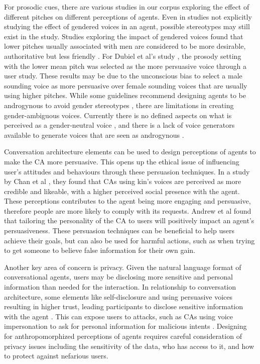 \documentclass[sigconf,screen,review, anonymous]{acmart}
\newcommand{\cmt}[1]{}%
\begin{document}
For prosodic cues, there are various studies in our corpus exploring the effect of different pitches on different perceptions of agents. Even in studies not explicitly studying the effect of gendered voices in an agent, possible stereotypes may still exist in the study. Studies exploring the impact of gendered voices found that lower pitches usually associated with men are considered to be more desirable, authoritative but less friendly \cite{tolmeijer2021female}\cmt{[62]}\cite{jestin2022effects}\cmt{[81]}. For Dubiel et al's study \cite{dubiel2020persuasive}\cmt{[60]}, the prosody setting with the lower mean pitch was selected as the more persuasive voice through a user study. These results may be due to the unconscious bias to select a male sounding voice as more persuasive over female sounding voices that are usually using higher pitches. While some guidelines recommend designing agents to be androgynous to avoid gender stereotypes \cite{ruane2019conversational}, there are limitations in creating gender-ambiguous voices. Currently there is no defined aspects on what is perceived as a gender-neutral voice  \cite{jestin2022effects}\cmt{[81]}, and there is a lack of voice generators available to generate voices that are seen as androgynous \cite{tolmeijer2021female}\cmt{[62]}.

Conversation architecture elements can be used to design perceptions of agents to make the CA more persuasive. This opens up the ethical issue of influencing user's attitudes and behaviours through these persuasion techniques. In a study by Chan et al \cite{chan2021kinvoices}\cmt{[74]}, they found that CAs using kin's voices are perceived as more credible and likeable, with a higher perceived social presence with the agent. These perceptions contributes to the agent being more engaging and persuasive, therefore people are more likely to comply with its requests. Andrew et al \cite{andrews2012system}\cmt{[38]} found that tailoring the personality of the CA to users will positively impact an agent's persuasiveness. These persuasion techniques can be beneficial to help users achieve their goals, but can also be used for harmful actions, such as when trying to get someone to believe false information for their own gain.

Another key area of concern is privacy. Given the natural language format of conversational agents, users may be disclosing more sensitive and personal information than needed for the interaction. In relationship to conversation architecture, some elements like self-disclosure and using persuasive voices resulting in higher trust, leading participants to disclose sensitive information with the agent \cite{lee2020hear}\cmt{[23]}\cite{dubiel2020persuasive}\cmt{[60]}. This can expose users to attacks, such as CAs using voice impersonation to ask for personal information for malicious intents \cite{chan2021kinvoices}\cmt{[74]}. Designing for anthropomorphized perceptions of agents requires careful consideration of privacy issues including the sensitivity of the data, who has access to it, and how to protect against nefarious users.
\end{document}
